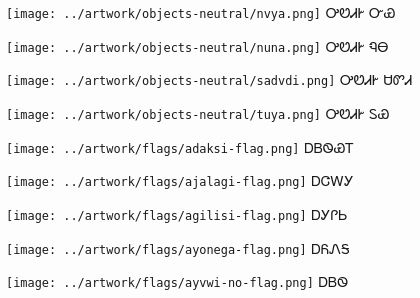 \documentclass[avery5371,frame]{flashcards}%
\begin{document}
\begin{flashcard}{
\texttt{[image: ../artwork/objects-neutral/nvya.png]}
}\Huge ᎤᏬᏗᎨ ᏅᏯ
\end{flashcard}

\begin{flashcard}{
\texttt{[image: ../artwork/objects-neutral/nuna.png]}
}\Huge ᎤᏬᏗᎨ ᏄᎾ
\end{flashcard}

\begin{flashcard}{
\texttt{[image: ../artwork/objects-neutral/sadvdi.png]}
}\Huge ᎤᏬᏗᎨ ᏌᏛᏗ
\end{flashcard}

\begin{flashcard}{
\texttt{[image: ../artwork/objects-neutral/tuya.png]}
}\Huge ᎤᏬᏗᎨ ᏚᏯ
\end{flashcard}


\begin{flashcard}{
\texttt{[image: ../artwork/flags/adaksi-flag.png]}
}\Huge ᎠᏴᏫᏯᎢ
\end{flashcard}

\begin{flashcard}{
\texttt{[image: ../artwork/flags/ajalagi-flag.png]}
}\Huge ᎠᏣᎳᎩ
\end{flashcard}

\begin{flashcard}{
\texttt{[image: ../artwork/flags/agilisi-flag.png]}
}\Huge ᎠᎩᎵᏏ
\end{flashcard}

\begin{flashcard}{
\texttt{[image: ../artwork/flags/ayonega-flag.png]}
}\Huge ᎠᏲᏁᎦ
\end{flashcard}

\begin{flashcard}{
\texttt{[image: ../artwork/flags/ayvwi-no-flag.png]}
}\Huge ᎠᏴᏫ
\end{flashcard}
\end{document}
